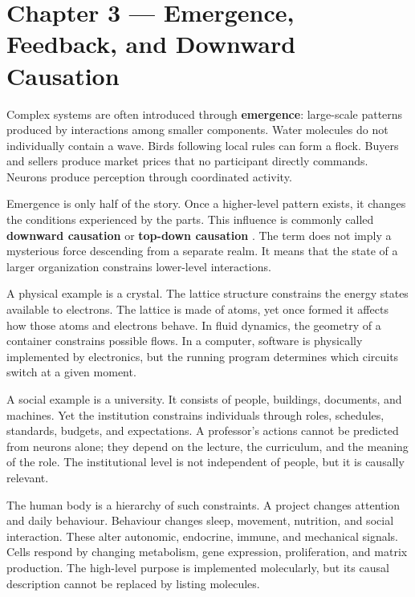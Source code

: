 \chapter{Chapter 3 --- Emergence, Feedback, and Downward Causation}\label{chapter-3-emergence-feedback-and-downward-causation}

Complex systems are often introduced through \textbf{emergence}: large-scale patterns produced by interactions among smaller components. Water molecules do not individually contain a wave. Birds following local rules can form a flock. Buyers and sellers produce market prices that no participant directly commands. Neurons produce perception through coordinated activity.

Emergence is only half of the story. Once a higher-level pattern exists, it changes the conditions experienced by the parts. This influence is commonly called \textbf{downward causation} or \textbf{top-down causation} \autocite{ellis2012topdown,noble2012biological}. The term does not imply a mysterious force descending from a separate realm. It means that the state of a larger organization constrains lower-level interactions.

A physical example is a crystal. The lattice structure constrains the energy states available to electrons. The lattice is made of atoms, yet once formed it affects how those atoms and electrons behave. In fluid dynamics, the geometry of a container constrains possible flows. In a computer, software is physically implemented by electronics, but the running program determines which circuits switch at a given moment.

A social example is a university. It consists of people, buildings, documents, and machines. Yet the institution constrains individuals through roles, schedules, standards, budgets, and expectations. A professor's actions cannot be predicted from neurons alone; they depend on the lecture, the curriculum, and the meaning of the role. The institutional level is not independent of people, but it is causally relevant.

The human body is a hierarchy of such constraints. A project changes attention and daily behaviour. Behaviour changes sleep, movement, nutrition, and social interaction. These alter autonomic, endocrine, immune, and mechanical signals. Cells respond by changing metabolism, gene expression, proliferation, and matrix production. The high-level purpose is implemented molecularly, but its causal description cannot be replaced by listing molecules.

